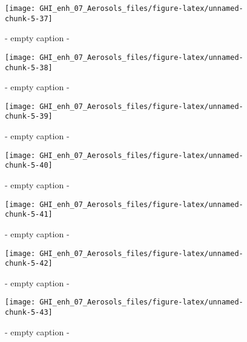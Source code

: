 \documentclass[
  10pt,
  a4paper,oneside]{article}
\begin{document}
\begin{figure}[H]

{\centering \texttt{[image: GHI\_enh\_07\_Aerosols\_files/figure-latex/unnamed-chunk-5-37]} 

}

\caption{ - empty caption - }\label{fig:unnamed-chunk-5-37}
\end{figure}
\begin{figure}[H]

{\centering \texttt{[image: GHI\_enh\_07\_Aerosols\_files/figure-latex/unnamed-chunk-5-38]} 

}

\caption{ - empty caption - }\label{fig:unnamed-chunk-5-38}
\end{figure}
\begin{figure}[H]

{\centering \texttt{[image: GHI\_enh\_07\_Aerosols\_files/figure-latex/unnamed-chunk-5-39]} 

}

\caption{ - empty caption - }\label{fig:unnamed-chunk-5-39}
\end{figure}
\begin{figure}[H]

{\centering \texttt{[image: GHI\_enh\_07\_Aerosols\_files/figure-latex/unnamed-chunk-5-40]} 

}

\caption{ - empty caption - }\label{fig:unnamed-chunk-5-40}
\end{figure}
\begin{figure}[H]

{\centering \texttt{[image: GHI\_enh\_07\_Aerosols\_files/figure-latex/unnamed-chunk-5-41]} 

}

\caption{ - empty caption - }\label{fig:unnamed-chunk-5-41}
\end{figure}
\begin{figure}[H]

{\centering \texttt{[image: GHI\_enh\_07\_Aerosols\_files/figure-latex/unnamed-chunk-5-42]} 

}

\caption{ - empty caption - }\label{fig:unnamed-chunk-5-42}
\end{figure}
\begin{figure}[H]

{\centering \texttt{[image: GHI\_enh\_07\_Aerosols\_files/figure-latex/unnamed-chunk-5-43]} 

}

\caption{ - empty caption - }\label{fig:unnamed-chunk-5-43}
\end{figure}
\end{document}
